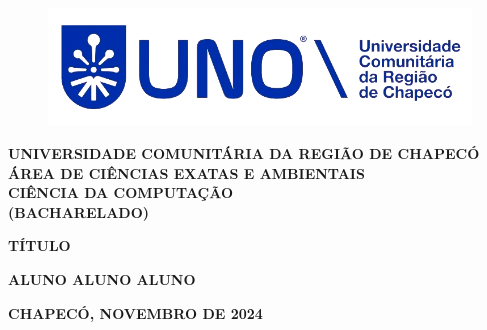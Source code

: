 \begin{center}
            \begin{figure}[htbp]
                \centering
                \includegraphics[width=13cm]{assets/unologo-enhanced.png}
            \end{figure}
        
            \MakeUppercase{\textbf{Universidade Comunitária da Região de Chapecó}} \\
            \MakeUppercase{\textbf{ÁREA DE CIÊNCIAS EXATAS E AMBIENTAIS}}\\
            \MakeUppercase{\textbf{Ciência da Computação}}\\
            \MakeUppercase{\textbf{(BACHARELADO)}}\\
            
            \vspace{4.5cm}
            
            \MakeUppercase{\textbf{TÍTULO}}
            
            \vspace{3.5cm}
            
            \MakeUppercase{\textbf{ALUNO ALUNO ALUNO}}
            
            \vfill
            
            \MakeUppercase{\textbf{Chapecó, novembro DE 2024}} 
         
\end{center}